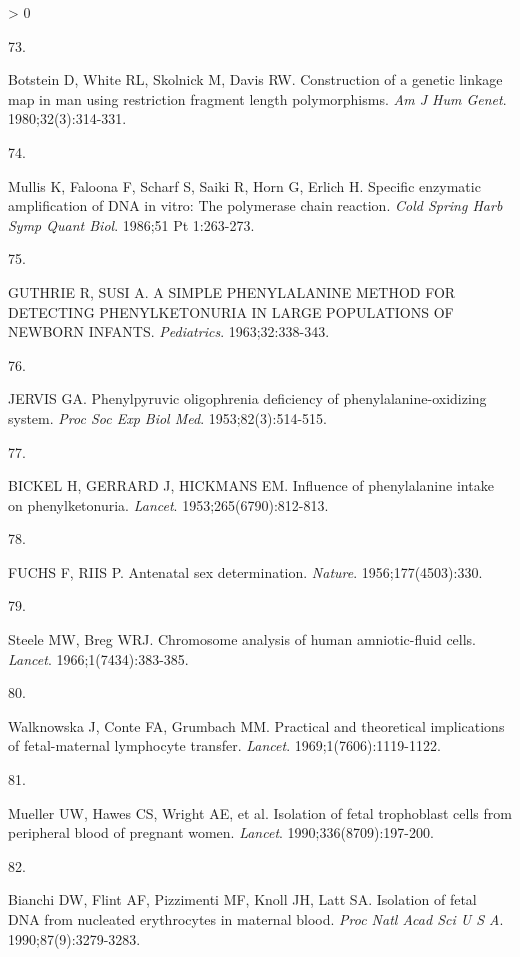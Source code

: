 \documentclass[11pt,letterpaper,oneside]{book}
\newlength{\cslhangindent}
\newlength{\csllabelwidth}
\newenvironment{CSLReferences}[3] %
 {%
  \setlength{\parindent}{0pt}
  \ifodd #1 \everypar{\setlength{\hangindent}{\cslhangindent}}\ignorespaces\fi
  \ifnum #2 > 0
  \setlength{\parskip}{#2\baselineskip}
  \fi
 }%
 {}
\newcommand{\CSLLeftMargin}[1]{\parbox[t]{\maxof{\widthof{#1}}{\csllabelwidth}}{#1}}
\newcommand{\CSLRightInline}[1]{\parbox[t]{\linewidth-\csllabelwidth}{#1}\newline}
\begin{document}
\begin{CSLReferences}{0}{0}
\leavevmode\hypertarget{ref-botstein:1980aa}{}%
\CSLLeftMargin{73. }
\CSLRightInline{Botstein D, White RL, Skolnick M, Davis RW. Construction of a genetic linkage map in man using restriction fragment length polymorphisms. \emph{Am J Hum Genet}. 1980;32(3):314-331.}

\leavevmode\hypertarget{ref-mullis:1986aa}{}%
\CSLLeftMargin{74. }
\CSLRightInline{Mullis K, Faloona F, Scharf S, Saiki R, Horn G, Erlich H. Specific enzymatic amplification of DNA in vitro: The polymerase chain reaction. \emph{Cold Spring Harb Symp Quant Biol}. 1986;51 Pt 1:263-273.}

\leavevmode\hypertarget{ref-guthrie:1963aa}{}%
\CSLLeftMargin{75. }
\CSLRightInline{GUTHRIE R, SUSI A. A SIMPLE PHENYLALANINE METHOD FOR DETECTING PHENYLKETONURIA IN LARGE POPULATIONS OF NEWBORN INFANTS. \emph{Pediatrics}. 1963;32:338-343.}

\leavevmode\hypertarget{ref-jervis:1953aa}{}%
\CSLLeftMargin{76. }
\CSLRightInline{JERVIS GA. Phenylpyruvic oligophrenia deficiency of phenylalanine-oxidizing system. \emph{Proc Soc Exp Biol Med}. 1953;82(3):514-515.}

\leavevmode\hypertarget{ref-bickel:1953aa}{}%
\CSLLeftMargin{77. }
\CSLRightInline{BICKEL H, GERRARD J, HICKMANS EM. Influence of phenylalanine intake on phenylketonuria. \emph{Lancet}. 1953;265(6790):812-813.}

\leavevmode\hypertarget{ref-fuchs:1956aa}{}%
\CSLLeftMargin{78. }
\CSLRightInline{FUCHS F, RIIS P. Antenatal sex determination. \emph{Nature}. 1956;177(4503):330.}

\leavevmode\hypertarget{ref-steele:1966aa}{}%
\CSLLeftMargin{79. }
\CSLRightInline{Steele MW, Breg WRJ. Chromosome analysis of human amniotic-fluid cells. \emph{Lancet}. 1966;1(7434):383-385.}

\leavevmode\hypertarget{ref-walknowska:1969aa}{}%
\CSLLeftMargin{80. }
\CSLRightInline{Walknowska J, Conte FA, Grumbach MM. Practical and theoretical implications of fetal-maternal lymphocyte transfer. \emph{Lancet}. 1969;1(7606):1119-1122.}

\leavevmode\hypertarget{ref-mueller:1990aa}{}%
\CSLLeftMargin{81. }
\CSLRightInline{Mueller UW, Hawes CS, Wright AE, et al. Isolation of fetal trophoblast cells from peripheral blood of pregnant women. \emph{Lancet}. 1990;336(8709):197-200.}

\leavevmode\hypertarget{ref-bianchi:1990aa}{}%
\CSLLeftMargin{82. }
\CSLRightInline{Bianchi DW, Flint AF, Pizzimenti MF, Knoll JH, Latt SA. Isolation of fetal DNA from nucleated erythrocytes in maternal blood. \emph{Proc Natl Acad Sci U S A}. 1990;87(9):3279-3283.}


\end{CSLReferences}
\end{document}
